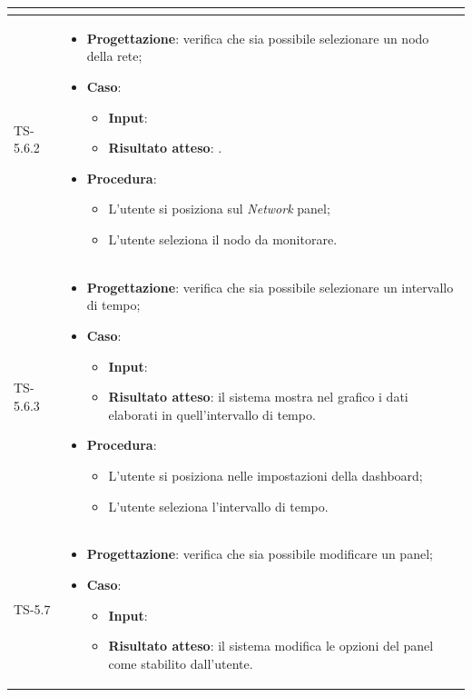 \begin{longtable}{|C{2.5cm}|C{13cm}|}
\begin{itemize}
\end{itemize}
	 \\
	\hline
	{TS-5.6.2} & 
\begin{itemize}
	\item \textbf{Progettazione}: verifica che sia possibile selezionare un
	nodo della rete;
	\item \textbf{Caso}: 
	\begin{itemize}
		\item \textbf{Input}: 
		\item \textbf{Risultato atteso}: .
	\end{itemize}
	\item \textbf{Procedura}:
	\begin{itemize}
		\item L'utente si posiziona sul \emph{Network} panel;
		\item L'utente seleziona il nodo da monitorare.
	\end{itemize} 
\end{itemize}
	 \\
	\hline
	{TS-5.6.3} & 
\begin{itemize}
	\item \textbf{Progettazione}: verifica che sia possibile selezionare un
	intervallo di tempo;
	\item \textbf{Caso}: 
	\begin{itemize}
		\item \textbf{Input}: 
		\item \textbf{Risultato atteso}: il sistema mostra nel grafico i dati elaborati in quell'intervallo di tempo.
	\end{itemize}
	\item \textbf{Procedura}:
	\begin{itemize}
		\item L'utente si posiziona nelle impostazioni della dashboard;
		\item L'utente seleziona l'intervallo di tempo.
	\end{itemize} 
\end{itemize}
	 \\
	\hline
	{TS-5.7} & 
\begin{itemize}
	\item \textbf{Progettazione}: verifica che sia possibile modificare un
	panel;
	\item \textbf{Caso}: 
	\begin{itemize}
		\item \textbf{Input}: 
		\item \textbf{Risultato atteso}: il sistema modifica le opzioni del panel come stabilito dall'utente.

\end{itemize}
\end{itemize}
\end{longtable}
